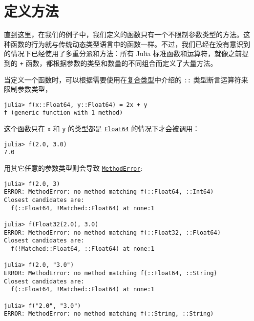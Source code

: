 \hypertarget{17361934126771506898}{}


\section{定义方法}



直到这里，在我们的例子中，我们定义的函数只有一个不限制参数类型的方法。这种函数的行为就与传统动态类型语言中的函数一样。不过，我们已经在没有意识到的情况下已经使用了多重分派和方法：所有 Julia 标准函数和运算符，就像之前提到的 \texttt{+} 函数，都根据参数的类型和数量的不同组合而定义了大量方法。



当定义一个函数时，可以根据需要使用在\hyperlink{4168730090950432836}{复合类型}中介绍的 \texttt{::} 类型断言运算符来限制参数类型，




\begin{verbatim}
julia> f(x::Float64, y::Float64) = 2x + y
f (generic function with 1 method)
\end{verbatim}



这个函数只在 \texttt{x} 和 \texttt{y} 的类型都是 \hyperlink{5027751419500983000}{\texttt{Float64}} 的情况下才会被调用：




\begin{verbatim}
julia> f(2.0, 3.0)
7.0
\end{verbatim}



用其它任意的参数类型则会导致 \hyperlink{68769522931907606}{\texttt{MethodError}}:




\begin{verbatim}
julia> f(2.0, 3)
ERROR: MethodError: no method matching f(::Float64, ::Int64)
Closest candidates are:
  f(::Float64, !Matched::Float64) at none:1

julia> f(Float32(2.0), 3.0)
ERROR: MethodError: no method matching f(::Float32, ::Float64)
Closest candidates are:
  f(!Matched::Float64, ::Float64) at none:1

julia> f(2.0, "3.0")
ERROR: MethodError: no method matching f(::Float64, ::String)
Closest candidates are:
  f(::Float64, !Matched::Float64) at none:1

julia> f("2.0", "3.0")
ERROR: MethodError: no method matching f(::String, ::String)
\end{verbatim}



